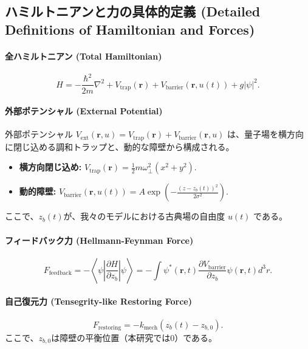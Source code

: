 \documentclass[a4paper,11pt,ja=standard,lualatex]{bxjsarticle}
\begin{document}
\subsection{ハミルトニアンと力の具体的定義 (Detailed Definitions of Hamiltonian and Forces)}

\paragraph{全ハミルトニアン (Total Hamiltonian)}
\begin{equation}
    H = -\frac{\hbar^2}{2m}\nabla^2 + V_{\text{trap}}(\mathbf{r}) + V_{\text{barrier}}(\mathbf{r}, u(t)) + g|\psi|^2.
\end{equation}

\paragraph{外部ポテンシャル (External Potential)}
外部ポテンシャル $V_{\text{ext}}(\mathbf{r}, u) = V_{\text{trap}}(\mathbf{r}) + V_{\text{barrier}}(\mathbf{r}, u)$ は、量子場を横方向に閉じ込める調和トラップと、動的な障壁から構成される。
\begin{itemize}
    \item \textbf{横方向閉じ込め:} $V_{\text{trap}}(\mathbf{r}) = \frac{1}{2}m\omega_{\perp}^2(x^2+y^2)$.
    \item \textbf{動的障壁:} $V_{\text{barrier}}(\mathbf{r}, u(t)) = A \exp\left(-\frac{(z-z_b(t))^2}{2\sigma^2}\right)$.
\end{itemize}
ここで、$z_b(t)$が、我々のモデルにおける古典場の自由度 $u(t)$ である。

\paragraph{フィードバック力 (Hellmann-Feynman Force)}
\begin{equation}
    F_{\text{feedback}} = -\left\langle \psi \left| \frac{\partial H}{\partial z_b} \right| \psi \right\rangle = -\int \psi^*(\mathbf{r},t) \frac{\partial V_{\text{barrier}}}{\partial z_b} \psi(\mathbf{r},t) d^3r.
\end{equation}

\paragraph{自己復元力 (Tensegrity-like Restoring Force)}
\begin{equation}
    F_{\text{restoring}} = -k_{\text{mech}}(z_b(t) - z_{b,0}).
\end{equation}
ここで、$z_{b,0}$は障壁の平衡位置（本研究では0）である。
\end{document}
